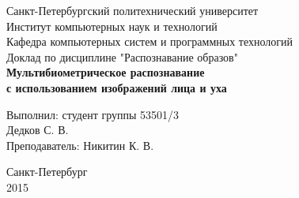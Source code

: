 \thispagestyle{empty}
\begin{center}
\large Санкт-Петербургский политехнический университет\\
Институт компьютерных наук и технологий\\
Кафедра компьютерных систем и программных технологий\\
\vspace{55mm}
\Large Доклад по дисциплине "Распознавание образов"\\
\LARGE\textbf{Мультибиометрическое распознавание \\ с использованием изображений лица и уха}
\end{center}

\vspace{40mm}
\begin{flushright}
\large Выполнил: студент группы 53501/3\\ Дедков С. В.\\ Преподаватель: Никитин К. В.
\end{flushright}
\vspace{40mm}

\begin{center}
Санкт-Петербург\\ 2015
\end{center}